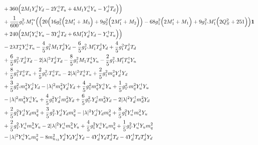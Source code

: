 {\begin{align}
 &+360 \Big(2 M_1 {Y_{d}^{\dagger}  Y_d}  -2 {Y_{u}^{\dagger}  T_u}  + 4 M_1 {Y_{u}^{\dagger}  Y_u}  - {Y_{d}^{\dagger}  T_d} \Big)\Big)\nonumber \\ 
 &+\frac{1}{600} g_{1'}^{2} M_1'^* \Big(\Big(20 \Big(16 g_{3}^{2} \Big(2 M_1'  + M_3\Big) + 9 g_{2}^{2} \Big(2 M_1'  + M_2\Big)\Big) -68 g_{1}^{2} \Big(2 M_1'  + M_1\Big) + 9 g_{1'}^{2} M_1' \Big(2 Q_{S}^{2}  + 251\Big)\Big){\bf 1} \nonumber \\ 
 &+240 \Big(2 M_1' {Y_{u}^{\dagger}  Y_u}  -3 {Y_{d}^{\dagger}  T_d}  + 6 M_1' {Y_{d}^{\dagger}  Y_d}  - {Y_{u}^{\dagger}  T_u} \Big)\Big)\nonumber \\ 
 &-2 \lambda T_{\lambda}^* {Y_{u}^{\dagger}  T_u} -\frac{4}{5} g_{1}^{2} M_1 {T_{d}^{\dagger}  Y_d} -\frac{6}{5} g_{1'}^{2} M_1' {T_{d}^{\dagger}  Y_d} +\frac{4}{5} g_{1}^{2} {T_{d}^{\dagger}  T_d} \nonumber \\ 
 &+\frac{6}{5} g_{1'}^{2} {T_{d}^{\dagger}  T_d} -2 |\lambda|^2 {T_{d}^{\dagger}  T_d} -\frac{8}{5} g_{1}^{2} M_1 {T_{u}^{\dagger}  Y_u} -\frac{2}{5} g_{1'}^{2} M_1' {T_{u}^{\dagger}  Y_u} \nonumber \\ 
 &+\frac{8}{5} g_{1}^{2} {T_{u}^{\dagger}  T_u} +\frac{2}{5} g_{1'}^{2} {T_{u}^{\dagger}  T_u} -2 |\lambda|^2 {T_{u}^{\dagger}  T_u} +\frac{2}{5} g_{1}^{2} {m_q^2  Y_{d}^{\dagger}  Y_d} \nonumber \\ 
 &+\frac{3}{5} g_{1'}^{2} {m_q^2  Y_{d}^{\dagger}  Y_d} - |\lambda|^2 {m_q^2  Y_{d}^{\dagger}  Y_d} +\frac{4}{5} g_{1}^{2} {m_q^2  Y_{u}^{\dagger}  Y_u} +\frac{1}{5} g_{1'}^{2} {m_q^2  Y_{u}^{\dagger}  Y_u} \nonumber \\ 
 &- |\lambda|^2 {m_q^2  Y_{u}^{\dagger}  Y_u} +\frac{4}{5} g_{1}^{2} {Y_{d}^{\dagger}  m_d^2  Y_d} +\frac{6}{5} g_{1'}^{2} {Y_{d}^{\dagger}  m_d^2  Y_d} -2 |\lambda|^2 {Y_{d}^{\dagger}  m_d^2  Y_d} \nonumber \\ 
 &+\frac{2}{5} g_{1}^{2} {Y_{d}^{\dagger}  Y_d  m_q^2} +\frac{3}{5} g_{1'}^{2} {Y_{d}^{\dagger}  Y_d  m_q^2} - |\lambda|^2 {Y_{d}^{\dagger}  Y_d  m_q^2} +\frac{8}{5} g_{1}^{2} {Y_{u}^{\dagger}  m_u^2  Y_u} \nonumber \\ 
 &+\frac{2}{5} g_{1'}^{2} {Y_{u}^{\dagger}  m_u^2  Y_u} -2 |\lambda|^2 {Y_{u}^{\dagger}  m_u^2  Y_u} +\frac{4}{5} g_{1}^{2} {Y_{u}^{\dagger}  Y_u  m_q^2} +\frac{1}{5} g_{1'}^{2} {Y_{u}^{\dagger}  Y_u  m_q^2} \nonumber \\ 
 &- |\lambda|^2 {Y_{u}^{\dagger}  Y_u  m_q^2} -8 m_{h_{13}}^2 {Y_{d}^{\dagger}  Y_d  Y_{d}^{\dagger}  Y_d} -4 {Y_{d}^{\dagger}  Y_d  T_{d}^{\dagger}  T_d} -4 {Y_{d}^{\dagger}  T_d  T_{d}^{\dagger}  Y_d} \nonumber \\ 

\end{align}}
